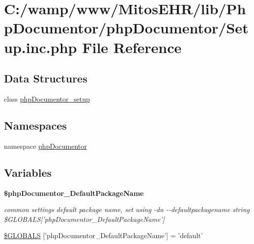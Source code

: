 \hypertarget{_setup_8inc_8php}{\section{\-C\-:/wamp/www/\-Mitos\-E\-H\-R/lib/\-Php\-Documentor/php\-Documentor/\-Setup.inc.\-php \-File \-Reference}
\label{_setup_8inc_8php}
}
\subsection*{\-Data \-Structures}
\begin{DoxyCompactItemize}
\item 
class \hyperlink{classphp_documentor__setup}{php\-Documentor\-\_\-setup}
\end{DoxyCompactItemize}
\subsection*{\-Namespaces}
\begin{DoxyCompactItemize}
\item 
namespace \hyperlink{namespacephp_documentor}{php\-Documentor}
\end{DoxyCompactItemize}
\subsection*{\-Variables}
\begin{Indent}{\bf \$php\-Documentor\-\_\-\-Default\-Package\-Name}\par
{\em common settings default package name, set using -\/dn -\/-\/defaultpackagename  string \$\-G\-L\-O\-B\-A\-L\-S\mbox{[}'php\-Documentor\-\_\-\-Default\-Package\-Name'\mbox{]} }\begin{DoxyCompactItemize}
\item 
\hyperlink{_setup_8inc_8php_a7ef1dde81166092f516ef631d2d7eac7}{\$\-G\-L\-O\-B\-A\-L\-S} \mbox{[}'php\-Documentor\-\_\-\-Default\-Package\-Name'\mbox{]} = 'default'
\end{DoxyCompactItemize}
\end{Indent}
